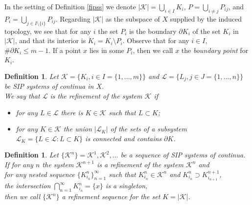 \documentclass[11pt,reqno]{amsart}
\newtheorem{definition}[theorem]{Definition}
\begin{document}
In the setting of Definition \ref{fipss} we denote $|\mathcal K|=\bigcup\limits_{i\in I}K_i$,   $P=\bigcup\limits_{i\neq j}P_{ij} $, and $P_i=\bigcup\limits_{j\in I\setminus\{i\}}P_{ij}$.  Regarding $|\mathcal K|$ as the subspace of $X$ supplied by the induced topology, we see that for any $i$ the set $P_i$ is the boundary $\partial K_i$ of the set $K_i$ in $|\mathcal K|$,  and that its interior is $\dot K_i=K_i\setminus P_i$.  Observe that for any $i\in I$,  $\#\partial K_i\le m-1$.
If a point $x$ lies in some $P_i$, then we call $x$ the {\em boundary point} for $K_i$.\\


\begin{definition}\label{refin}\cite{TYK}
Let  $ \mathcal K = \{K_i,i \in I =  \{1,\hdots,m \} \}$  and  $\mathcal L= \{L_j,j \in J =  \{1,\hdots,n \} \}$  be SIP systems of continua in $X$.\\
We say that $\mathcal L$ {\em is the refinement} of the system $\mathcal K$ if
\begin{itemize}
\item[(i)] for any $L \in \mathcal L$ there is $K \in \mathcal K$ such that $L \subset K$;
\item[(ii)]for any $K \in \mathcal K$ the union $|{\mathcal L}_K| $ of the sets of a subsystem $\mathcal L_K = \{ L \in \mathcal L : L \subset K \}$ is connected and contains $\partial K$.
\end{itemize}

\end{definition}

\begin{definition}\label{refsys}\cite{TYK}
Let $\{\mathcal K^n \} = \mathcal K^1, \mathcal K^2, \hdots $ be a sequence of SIP systems of continua. If for any $n$ the system $\mathcal K^{n+1}$ is a refinement of the system $\mathcal K^{n}$ and\\ for any nested sequence  $\{K^n_{i_n} \}_{n=1}^\infty$ such that $K^n_{i_n} \in \mathcal K^n$ and $K^n_{i_n} \supset K^{n+1}_{i_{n+1}}$,\\ the intersection $\bigcap\limits_{n=1}^\infty K^n_{i_n} = \{x\}$ is a singleton,\\ then we call $\{\mathcal K^n\}$ {\em a refinement sequence} for the set $K=|\mathcal K|$.
\end{definition}
\end{document}
